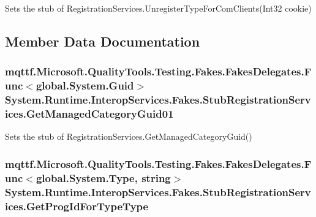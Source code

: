 Sets the stub of Registration\-Services.\-Unregister\-Type\-For\-Com\-Clients(\-Int32 cookie)



\subsection{Member Data Documentation}
\hypertarget{class_system_1_1_runtime_1_1_interop_services_1_1_fakes_1_1_stub_registration_services_a6a0381fc66b8b52374e14ce9e29936d4}{
\subsubsection[{Get\-Managed\-Category\-Guid01}]{\setlength{\rightskip}{0pt plus 5cm}mqttf.\-Microsoft.\-Quality\-Tools.\-Testing.\-Fakes.\-Fakes\-Delegates.\-Func$<$global.\-System.\-Guid$>$ System.\-Runtime.\-Interop\-Services.\-Fakes.\-Stub\-Registration\-Services.\-Get\-Managed\-Category\-Guid01}}\label{class_system_1_1_runtime_1_1_interop_services_1_1_fakes_1_1_stub_registration_services_a6a0381fc66b8b52374e14ce9e29936d4}


Sets the stub of Registration\-Services.\-Get\-Managed\-Category\-Guid()

\hypertarget{class_system_1_1_runtime_1_1_interop_services_1_1_fakes_1_1_stub_registration_services_a3c3a7d38b2fa61346855315674ba1048}{
\subsubsection[{Get\-Prog\-Id\-For\-Type\-Type}]{\setlength{\rightskip}{0pt plus 5cm}mqttf.\-Microsoft.\-Quality\-Tools.\-Testing.\-Fakes.\-Fakes\-Delegates.\-Func$<$global.\-System.\-Type, string$>$ System.\-Runtime.\-Interop\-Services.\-Fakes.\-Stub\-Registration\-Services.\-Get\-Prog\-Id\-For\-Type\-Type}}\label{class_system_1_1_runtime_1_1_interop_services_1_1_fakes_1_1_stub_registration_services_a3c3a7d38b2fa61346855315674ba1048}


